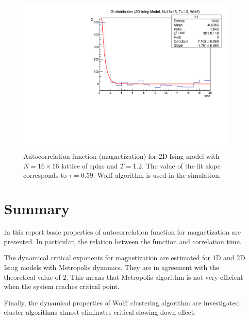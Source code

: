 \documentclass[11pt,a4paper]{article}%
\begin{document}
\begin{figure}[!ht]
\centering
  \includegraphics[scale=0.6]{Gt_2D_wolff.pdf}
  \vspace{-0.05in}
   \caption[]{Autocorrelation function (magnetization) for 2D Ising model with $N=16\times16$ lattice of spins and $T=1.2$. The value of the fit slope corresponds to $\tau=0.59$. Wolff algorithm is used in the simulation.}   
  \label{gt_2d_wolff}
\end{figure}

\clearpage
\section{Summary}
In this report basic properties of autocorrelation function for magnetization are presented. In particular, the relation between the function and correlation time.

The dynamical critical exponents for magnetization are estimated for 1D and 2D Ising models with Metropolis dynamics. They are in agreement with the theoretical value of $2$. This means that Metropolis algorithm is not very efficient when the system reaches critical point.

Finally, the dynamical properties of Wolff clustering algorithm are investigated: cluster algorithms almost eliminates critical slowing down effect.





\end{document}
